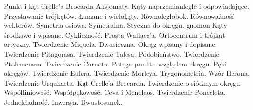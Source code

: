 Punkt i kąt Crelle'a-Brocarda
Aksjomaty. Kąty naprzemianległe i odpowiadające.
Przystawanie trójkątów.
Łamane i wielokąty.
Równoległobok.
Równoważność wektorów.
Symetria osiowa.
Symetralna.
Styczna do okręgu.
gnomon %
Kąty środkowe i wpisane.
Cykliczność. Prosta Wallace'a.
Ortocentrum i trójkąt ortyczny.
Twierdzenie Miquela.
Dwusieczna. Okrąg wpisany i dopisane.
Twierdzenie Pitagorasa.
Twierdzenie Talesa.
Podobieństwo.
Twierdzenie Ptolemeusza.
Twierdzenie Carnota.
Potęga punktu względem okręgu.
Pęki okręgów.
Twierdzenie Eulera.
Twierdzenie Morleya.
Trygonometria. Wzór Herona.
Twierdzenie Urquharta.
Kąt Crelle'a-Brocarda.
Twierdzenie o siódmym okręgu.
Współliniowość.
Współpękowość.
Ceva i Menelaos.
Twierdzenie Ponceleta.
Jednokładność.
Inwersja.
Dwustosunek.